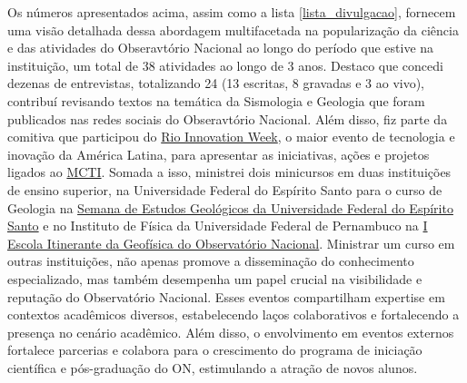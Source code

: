 \documentclass[10pt,a4paper,oneside]{book}
\begin{document}
Os números apresentados acima, assim como a lista \ref{lista_divulgacao}, fornecem uma visão detalhada dessa abordagem multifacetada na popularização da ciência e das atividades do Obseravtório Nacional ao longo do período que estive na instituição, um total de 38 atividades ao longo de 3 anos. Destaco que concedi dezenas de entrevistas, totalizando 24 (13 escritas, 8 gravadas e 3 ao vivo), contribuí revisando textos na temática da Sismologia e Geologia que foram publicados nas redes sociais do Obseravtório Nacional. Além disso, fiz parte da comitiva que participou do \href{https://www.gov.br/observatorio/pt-br/assuntos/areas-de-atuacao/divulgacao-e-popularizacao-da-ciencia/on-riw}{Rio Innovation Week}, o maior evento de tecnologia e inovação da América Latina, para apresentar as iniciativas, ações e projetos ligados ao \href{https://www.gov.br/mcti/pt-br}{MCTI}. Somada a isso, ministrei dois minicursos em duas instituições de ensino superior, na Universidade Federal do Espírito Santo para o curso de Geologia na \href{https://www.instagram.com/segeo.ufes/}{Semana de Estudos Geológicos da Universidade Federal do Espírito Santo} e no Instituto de Física da Universidade Federal de Pernambuco na \href{https://www.gov.br/observatorio/pt-br/assuntos/noticias/i-escola-itinerante-da-geofisica-do-observatorio-nacional-e-realizada-na-ufpe}{I Escola Itinerante da Geofísica do Observatório Nacional}. Ministrar um curso em outras instituições, não apenas promove a disseminação do conhecimento especializado, mas também desempenha um papel crucial na visibilidade e reputação do Observatório Nacional. Esses eventos compartilham expertise em contextos acadêmicos diversos, estabelecendo laços colaborativos e fortalecendo a presença no cenário acadêmico. Além disso, o envolvimento em eventos externos fortalece parcerias e colabora para o crescimento do programa de iniciação científica e pós-graduação do ON, estimulando a atração de novos alunos.

\bigskip
\end{document}
